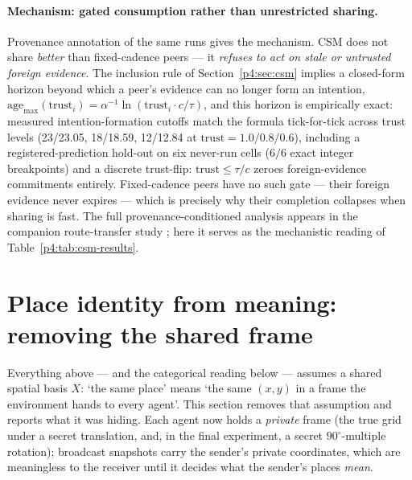 \documentclass{article}
\begin{document}
\paragraph{Mechanism: gated consumption rather than unrestricted sharing.} Provenance
annotation of the same runs gives the mechanism. CSM does not share
\emph{better} than fixed-cadence peers --- it \emph{refuses to act on
stale or untrusted foreign evidence}. The inclusion rule of
Section~\ref{p4:sec:csm} implies a closed-form horizon beyond which a
peer's evidence can no longer form an intention,
$\mathrm{age}_{\max}(\mathrm{trust}_i) = \alpha^{-1}
\ln(\mathrm{trust}_i \cdot c/\tau)$, and this horizon is empirically
exact: measured intention-formation cutoffs match the formula
tick-for-tick across trust levels (23/23.05, 18/18.59, 12/12.84 at
$\mathrm{trust}=1.0/0.8/0.6$), including a registered-prediction
hold-out on six never-run cells ($6/6$ exact integer breakpoints) and
a discrete trust-flip: $\mathrm{trust}\le\tau/c$ zeroes
foreign-evidence commitments entirely. Fixed-cadence peers have no
such gate --- their foreign evidence never expires --- which is
precisely why their completion collapses when sharing is fast. The
full provenance-conditioned analysis appears in the companion route-transfer study \citep{songlines2}; here it serves as the mechanistic reading of
Table~\ref{p4:tab:csm-results}.


\section{Place identity from meaning: removing the shared frame}
\label{p4:sec:semantic-identity}

Everything above --- and the categorical reading below --- assumes a
shared spatial basis $X$: `the same place' means `the same $(x,y)$ in
a frame the environment hands to every agent'. This section removes
that assumption and reports what it was hiding. Each agent now holds a
\emph{private} frame (the true grid under a secret translation, and,
in the final experiment, a secret $90^\circ$-multiple rotation);
broadcast snapshots carry the sender's private coordinates, which are
meaningless to the receiver until it decides what the sender's places
\emph{mean}.
\end{document}
